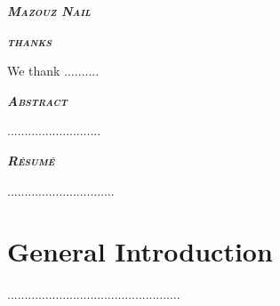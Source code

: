 \documentclass[english,a4,12pt]{report}
\begin{document}
    \begin{flushright}
        \textbf{\textsc{\itshape Mazouz Nail}}
    \end{flushright}

    \newpage
    \begin{center}
        \textbf{\huge \textsc{\itshape thanks}}
    \end{center}
    \textsf{\qquad We thank .......... }

    \newpage
    \begin{center}
    \textbf{\huge \textsc{\itshape \textit Abstract}}\\
    \end{center}
    \qquad ...........................

    \newpage
    \newcommand{\enteteresume}{\markboth{Resume}{Resume}} %
    \begin{center}
    \textbf{\huge \textsc{\itshape \textit Résumé}}\\
    \end{center}
    \qquad ...............................

    \tableofcontents
    \listoffigures
    \listoftables

    \chapter*{General Introduction}
    \setcounter{page}{1}
    \lhead{}
    \cfoot{\bfseries \thepage}

    ..................................................

    
\end{document}
